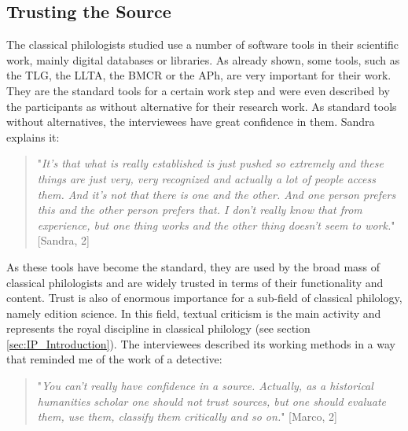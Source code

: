 \documentclass[12pt, a4paper, titlepage, oneside, abstract=true, toc=listof, toc=bibliography]{scrreprt}
\begin{document}
{%



\subsection{Trusting the Source}
\label{sec:trust}
The classical philologists studied use a number of software tools in their scientific work, mainly digital databases or libraries. As already shown, some tools, such as the TLG, the LLTA, the BMCR or the APh, are very important for their work. They are the standard tools for a certain work step and were even described by the participants as without alternative for their research work. As standard tools without alternatives, the interviewees have great confidence in them. Sandra explains it:

\begin{quotation}
"\textit{It's that what is really established is just pushed so extremely and these things are just very, very recognized and actually a lot of people access them. And it's not that there is one and the other. And one person prefers this and the other person prefers that. I don't really know that from experience, but one thing works and the other thing doesn't seem to work.}" [Sandra, 2]
\end{quotation}

As these tools have become the standard, they are used by the broad mass of classical philologists and are widely trusted in terms of their functionality and content. 
Trust is also of enormous importance for a sub-field of classical philology, namely edition science. In this field, textual criticism is the main activity and represents the royal discipline in classical philology (see section \ref{sec:IP_Introduction}). The interviewees described its working methods in a way that reminded me of the work of a detective:

\begin{quotation}
"\textit{You can't really have confidence in a source. Actually, as a historical humanities scholar one should not trust sources, but one should evaluate them, use them, classify them critically and so on.}" [Marco, 2]
\end{quotation}

}
\end{document}
